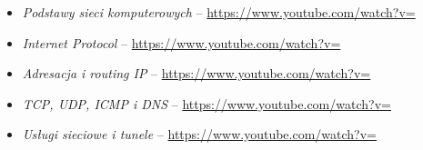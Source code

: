 % 
% 
% 
% 

\begin{itemize}
\item \emph{Podstawy sieci komputerowych} – \url{https://www.youtube.com/watch?v=}
\item \emph{Internet Protocol} – \url{https://www.youtube.com/watch?v=}
\item \emph{Adresacja i routing IP} – \url{https://www.youtube.com/watch?v=}
\item \emph{TCP, UDP, ICMP i DNS} – \url{https://www.youtube.com/watch?v=}
\item \emph{Usługi sieciowe i tunele} – \url{https://www.youtube.com/watch?v=}
\end{itemize}
